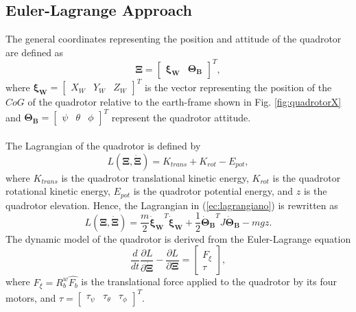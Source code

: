 \subsection{Euler-Lagrange Approach}
The general coordinates representing the position and attitude of the quadrotor are defined as
\begin{equation}
	\mathbf{\Xi}=\begin{bmatrix}
	\mathbf{\xi_W} & \mathbf{\Theta_B}
	\end{bmatrix}^{T},
	\label{ec:coorgenerales}
\end{equation}
where $\mathbf{\xi_W}=\begin{bmatrix}
X_W & Y_W & Z_W
\end{bmatrix}^{T}$ is the vector representing the position of the $CoG$ of the quadrotor relative to the earth-frame shown in Fig. \ref{fig:quadrotorX} and $\mathbf{\Theta_B}=\begin{bmatrix}
\psi & \theta & \phi
\end{bmatrix}^{T}$ represent the quadrotor attitude.
\\\\
The Lagrangian of the quadrotor is defined by
\begin{equation}
	L(\mathbf{\Xi},\mathbf{\dot{\Xi}})=K_{trans}+K_{rot} - E_{pot},	
	\label{ec:lagrangiano}
\end{equation}
where $ K_{trans}$ is the quadrotor translational kinetic energy, $ K_{rot}$ is the quadrotor rotational kinetic energy, $E_{pot}$ is the quadrotor potential energy, and $z$ is the quadrotor elevation. Hence, the Lagrangian in (\ref{ec:lagrangiano}) is rewritten as
\begin{equation}
	L(\mathbf{\Xi},\mathbf{\dot{\Xi}})=\dfrac{m}{2}\mathbf{\dot{\xi}_W}^{T}\mathbf{\dot{\xi}_W} + \dfrac{1}{2}\mathbf{\dot{\Theta}_B}^{T}J\mathbf{\dot{\Theta}_B} - mgz.
	\label{ec:lagrangiano2}
\end{equation}
The dynamic model of the quadrotor is derived from the Euler-Lagrange equation
\begin{equation}
	\dfrac{d}{dt}\dfrac{\partial L}{\partial \mathbf{\dot{\Xi}}}-\dfrac{\partial L}{\partial \mathbf{\Xi}}=
	\begin{bmatrix}
	F_{\xi}\\
	\tau
	\end{bmatrix},
	\label{ec:eulerlag}
 \end{equation} 
where $F_{\xi}=R_{b}^{w}\hat{F_{b}}$ is the translational force applied to the quadrotor by its four motors, and $\tau = \begin{bmatrix}
\tau_\psi & \tau_\theta & \tau_\phi
\end{bmatrix}^{T}$.
